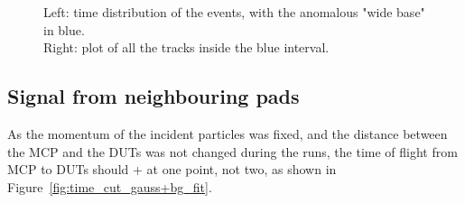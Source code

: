 \begin{figure}[h!tbp]
    \centering
    \hfill
    \captionsetup{width=\captionwidth}
    \caption{Left: time distribution of the events, with the anomalous "wide base" in blue. \\
    Right: plot of all the tracks inside the blue interval.}
    \label{fig:time_difference_wide_gaussian}
\end{figure}


\subsection{Signal from neighbouring pads}\label{sec:multiple_peaks}

As the momentum of the incident particles was fixed, and the distance between the MCP and the DUTs was not changed during the runs, the time of flight from MCP to DUTs should + at one point, not two, as shown in Figure~\ref{fig:time_cut_gauss+bg_fit}. 

